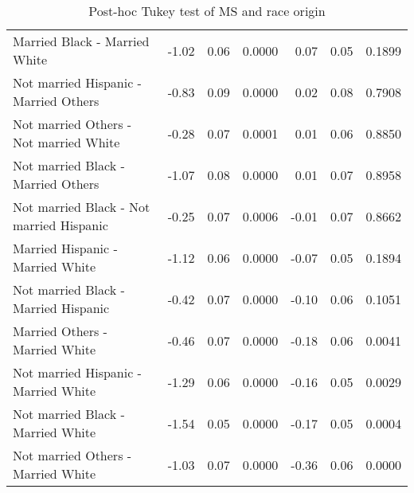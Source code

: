 \documentclass[11pt]{extarticle} %
\begin{document}
\begin{table}[H]
\begin{tabular}{lrrrrrr}
    Married Black -  Married White & -1.02 & 0.06 & 0.0000 & 0.07 & 0.05 & 0.1899 \\ 
    Not married Hispanic -  Married Others & -0.83 & 0.09 & 0.0000 & 0.02 & 0.08 & 0.7908 \\ 
    Not married Others -  Not married White & -0.28 & 0.07 & 0.0001 & 0.01 & 0.06 & 0.8850 \\ 
    Not married Black -  Married Others & -1.07 & 0.08 & 0.0000 & 0.01 & 0.07 & 0.8958 \\ 
    Not married Black -  Not married Hispanic & -0.25 & 0.07 & 0.0006 & -0.01 & 0.07 & 0.8662 \\ 
    Married Hispanic -  Married White & -1.12 & 0.06 & 0.0000 & -0.07 & 0.05 & 0.1894 \\ 
    Not married Black -  Married Hispanic & -0.42 & 0.07 & 0.0000 & -0.10 & 0.06 & 0.1051 \\ 
    Married Others -  Married White & -0.46 & 0.07 & 0.0000 & -0.18 & 0.06 & 0.0041 \\ 
    Not married Hispanic -  Married White & -1.29 & 0.06 & 0.0000 & -0.16 & 0.05 & 0.0029 \\ 
    Not married Black -  Married White & -1.54 & 0.05 & 0.0000 & -0.17 & 0.05 & 0.0004 \\ 
    Not married Others -  Married White & -1.03 & 0.07 & 0.0000 & -0.36 & 0.06 & 0.0000 \\ 
   \hline
\end{tabular}
\caption{Post-hoc Tukey test of MS and race origin} 
\label{tab:Table7RaceOriginMS}
\end{table}
\end{document}
